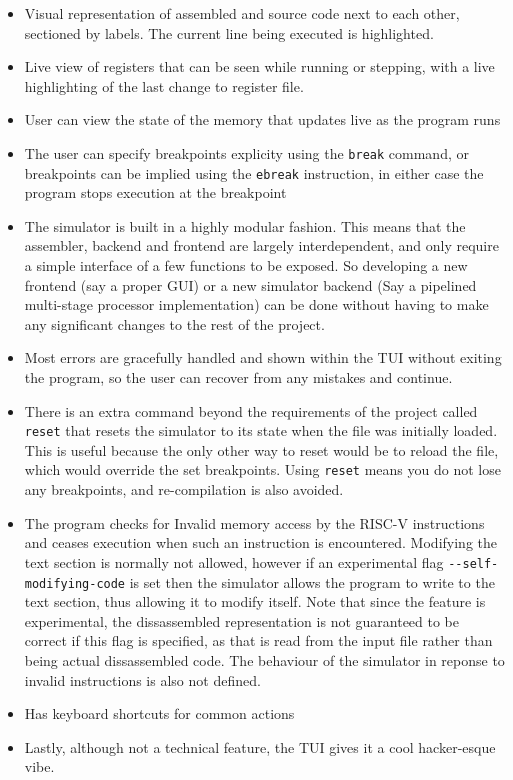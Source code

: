 \documentclass[12pt]{article}
\begin{document}
	\begin{itemize}
		\item Visual representation of assembled and source code next to each other, sectioned by labels. The current line being executed is highlighted.

		\item Live view of registers that can be seen while running or stepping, with a live highlighting of the last change to register file.
		
		\item User can view the state of the memory that updates live as the program runs
		
		\item The user can specify breakpoints explicity using the \verb|break| command, or breakpoints can be implied using the \verb|ebreak| instruction, in either case the program stops execution at the breakpoint
		
		\item The simulator is built in a highly modular fashion. This means that the assembler, backend and frontend are largely interdependent, and only require a simple interface of a few functions to be exposed. So developing a new frontend (say a proper GUI) or a new simulator backend (Say a pipelined multi-stage processor implementation) can be done without having to make any significant changes to the rest of the project.
		
		\item Most errors are gracefully handled and shown within the TUI without exiting the program, so the user can recover from any mistakes and continue.
		
		\item There is an extra command beyond the requirements of the project called \verb|reset| that resets the simulator to its state when the file was initially loaded. This is useful because the only other way to reset would be to reload the file, which would override the set breakpoints. Using \verb|reset| means you do not lose any breakpoints, and re-compilation is also avoided.
		
		\item The program checks for Invalid memory access by the RISC-V instructions and ceases execution when such an instruction is encountered. Modifying the text section is normally not allowed, however if an experimental flag \verb|--self-modifying-code| is set then the simulator allows the program to write to the text section, thus allowing it to modify itself. Note that since the feature is experimental, the dissassembled representation is not guaranteed to be correct if this flag is specified, as that is read from the input file rather than being actual dissassembled code. The behaviour of the simulator in reponse to invalid instructions is also not defined.
		
		\item Has keyboard shortcuts for common actions

		\item Lastly, although not a technical feature, the TUI gives it a cool hacker-esque vibe.
	\end{itemize}
	
\end{document}
